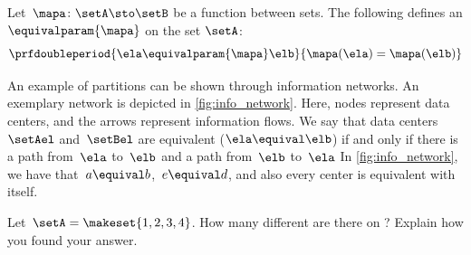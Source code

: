 \begin{example}
    Let~$\mapa\colon \setA \sto \setB$ be a function between sets.
    The following defines an  $\equivalparam{\mapa}$ on the set $\setA$:
    \begin{equation}
        \prfdoubleperiod{
            \ela\equivalparam{\mapa} \elb
        }{
            \mapa(\ela)=\mapa(\elb)
        }
    \end{equation}
\end{example}

\begin{marginfigure}
    \centering
    \caption{}
    \label{fig:info_network}
\end{marginfigure}

\begin{example}
    An example of partitions can be shown through information networks.
    An exemplary network is depicted in \cref{fig:info_network}.
    Here, nodes represent data centers, and the arrows represent information flows.
    We say that data centers~$\setAel$ and~$\setBel$ are equivalent ($\ela\equival \elb$) if and only if there is a path from~$\ela$ to~$\elb$ and a path from~$\elb$ to~$\ela$
    In \cref{fig:info_network}, we have that~$a\equival b$,~$e\equival d$, and also every center is equivalent with itself.
\end{example}

\vfill
\begin{gradedexercise}
    \label{ex:CountingEquivalenceRelations}
    Let~$\setA = \makeset{ 1, 2, 3, 4 }$.
    How many different  are there on \setA?
    Explain how you found your answer.
\end{gradedexercise}



